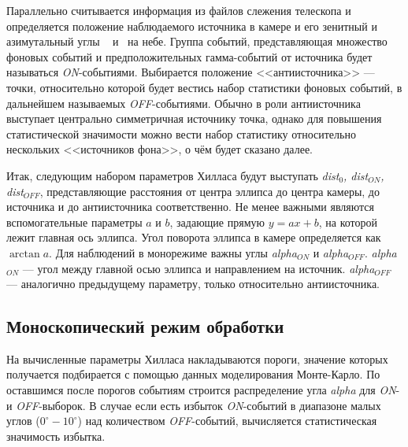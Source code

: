 \documentclass[magd,floatypics,numeref]{msudipl} %
\begin{document}
Параллельно считывается информация из файлов слежения телескопа и определяется положение наблюдаемого источника в камере и  его зенитный и азимутальный углы \vartheta~ и \varphi ~на небе.  Группа событий, представляющая множество фоновых событий и предположительных гамма-событий от источника будет называться \textit{ON}-событиями. Выбирается положение <<антиисточника>> --- точки, относительно которой будет вестись набор статистики фоновых событий, в дальнейшем называемых \textit{OFF}-событиями. Обычно в роли антиисточника выступает центрально симметричная источнику точка, однако для повышения статистической значимости можно вести набор статистику относительно нескольких <<источников фона>>, о чём будет сказано далее.   

Итак, следующим набором параметров Хилласа будут выступать \textit{dist$_{0}$, dist$_{ON}$,  dist$_{OFF}$}, представляющие расстояния от центра эллипса до центра камеры, до источника и до антиисточника соответственно. Не менее важными являются вспомогательные параметры $a$ и $b$, задающие прямую $y = ax + b$, на которой лежит главная ось эллипса. Угол поворота эллипса в камере определяется как $\arctan a$. Для наблюдений в монорежиме важны углы \textit{alpha$_{ON}$} и \textit{alpha$_{OFF}$}. \textit{alpha$_{ON}$} --- угол между главной осью эллипса и направлением на источник.  \textit{alpha$_{OFF}$} --- аналогично предыдущему параметру, только относительно антиисточника.
\subsection{Моноскопический режим обработки}
На вычисленные параметры Хилласа накладываются пороги, значение которых получается подбирается с помощью данных моделирования Монте-Карло. По оставшимся после порогов событиям строится распределение угла \textit{alpha} для \textit{ON}- и \textit{OFF}-выборок. В случае если есть избыток \textit{ON}-событий в диапазоне малых углов ($0^{\circ}-10^{\circ}$) над количеством \textit{OFF}-событий, вычисляется статистическая значимость избытка. 
\end{document}
